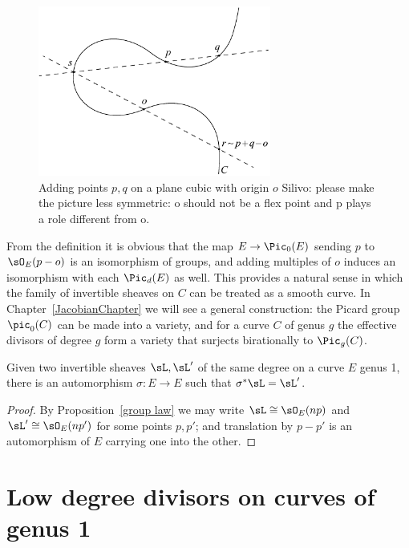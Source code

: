 \begin{figure}
\centerline {\includegraphics[height=2.2in]{"main/Fig03-2"}}
 \caption{Adding points $p, q$ on a plane cubic with origin $o$
 {Silivo: please make the picture less symmetric: o should not be a flex point and p plays a role different from o.}}
\label{group law on cubic}\end{figure}

\begin{remark}
From the definition it is obvious that 
the map
$E \to \Pic_0(E)$ sending $p$ to $\sO_E(p-o)$ is an isomorphism of groups, and adding multiples of $o$
induces an isomorphism with each $\Pic_d(E)$ as well. This provides a natural sense
in which the family of invertible sheaves on $C$ can be treated as a smooth curve.
 In Chapter~\ref{JacobianChapter} we will see a general construction: the Picard group $\pic_0(C)$ can be made into
a variety, and for a curve $C$ of genus $g$ the effective divisors
of degree $g$ form a variety that surjects birationally to $\Pic_g(C)$. 
\end{remark}
 

\begin{corollary}\label{equivalence of sheaves}
Given two invertible sheaves $\sL, \sL'$ of the same degree on a curve $E$ genus 1, there is an automorphism $\sigma: E\to E$
such that $\sigma^*\sL = \sL'$.
\end{corollary}

\begin{proof}
By Proposition~\ref{group law} we may write $\sL \cong \sO_E(np)$ and $\sL'\cong \sO_E(np')$ for some points $p,p'$; and translation by $p-p'$
is an automorphism of $E$ carrying one into the other.
\end{proof}


\section{Low degree divisors on curves of genus 1} 

